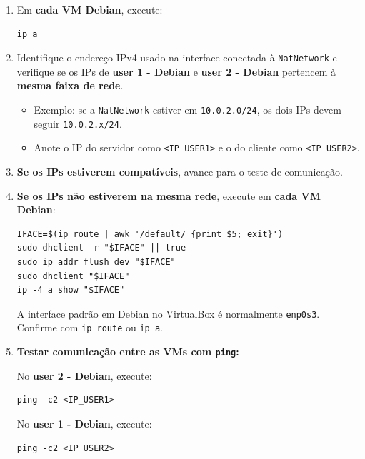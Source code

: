 \begin{enumerate}
\item Em \textbf{cada VM Debian}, execute:
\begin{lstlisting}
ip a
\end{lstlisting}

\item Identifique o endereço IPv4 usado na interface conectada à \texttt{NatNetwork} e verifique se os IPs de \textbf{user 1 - Debian} e \textbf{user 2 - Debian} pertencem à \textbf{mesma faixa de rede}.
  \begin{itemize}
    \item Exemplo: se a \texttt{NatNetwork} estiver em \texttt{10.0.2.0/24}, os dois IPs devem seguir \texttt{10.0.2.x/24}.
    \item Anote o IP do servidor como \texttt{<IP\_USER1>} e o do cliente como \texttt{<IP\_USER2>}.
  \end{itemize}


\item \textbf{Se os IPs estiverem compatíveis}, avance para o teste de comunicação.

\item \textbf{Se os IPs não estiverem na mesma rede}, execute em \textbf{cada VM Debian}:
\begin{lstlisting}
IFACE=$(ip route | awk '/default/ {print $5; exit}')
sudo dhclient -r "$IFACE" || true
sudo ip addr flush dev "$IFACE"
sudo dhclient "$IFACE"
ip -4 a show "$IFACE"
\end{lstlisting}

\begin{notebox}
A interface padrão em Debian no VirtualBox é normalmente \texttt{enp0s3}. Confirme com \texttt{ip route} ou \texttt{ip a}.
\end{notebox}

\item \textbf{Testar comunicação entre as VMs com \texttt{ping}:}

No \textbf{user 2 - Debian}, execute:
\begin{lstlisting}
ping -c2 <IP_USER1>
\end{lstlisting}

No \textbf{user 1 - Debian}, execute:
\begin{lstlisting}
ping -c2 <IP_USER2>
\end{lstlisting}

\end{enumerate}

